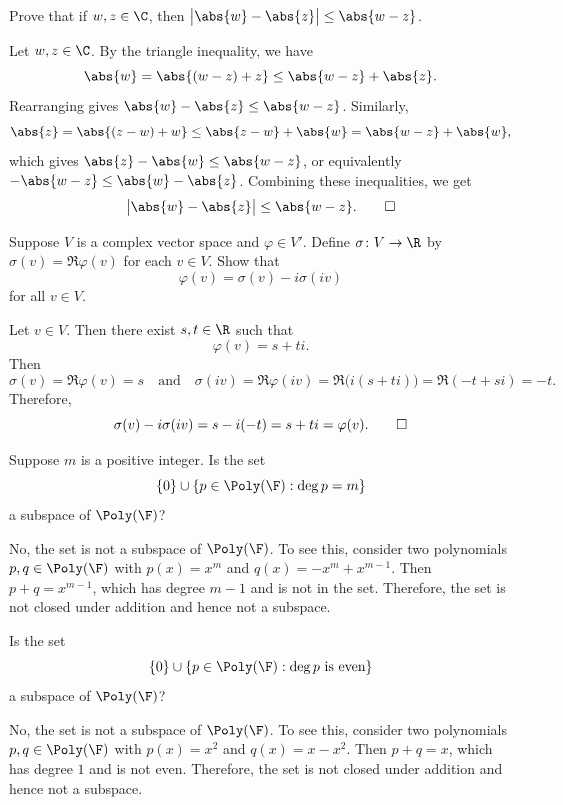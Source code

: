 \begin{exc}
\begin{exercise}
Prove that if $w,z\in\C$, then $\bigl\lvert\abs{w}-\abs{z}\bigr\rvert
\le\abs{w-z}$.
\end{exercise}
\begin{solution}
Let $w,z\in\C$. By the triangle inequality, we have
\[ \abs{w}=\abs{(w-z)+z}\le\abs{w-z}+\abs{z}. \]
Rearranging gives $\abs{w}-\abs{z}\le\abs{w-z}$. Similarly,
\[ \abs{z}=\abs{(z-w)+w}\le\abs{z-w}+\abs{w}=\abs{w-z}+\abs{w}, \]
which gives $\abs{z}-\abs{w}\le\abs{w-z}$, or equivalently
$-\abs{w-z}\le\abs{w}-\abs{z}$. Combining these inequalities, we get
\[ \bigl\lvert\abs{w}-\abs{z}\bigr\rvert\le\abs{w-z}. \qedhere \]
\end{solution}

\begin{exercise}
Suppose $V$ is a complex vector space and $\varphi\in V'$. Define
$\sigma\colon V\to\R$ by $\sigma(v)=\Re\varphi(v)$ for each $v\in V$. Show that
\[ \varphi(v) = \sigma(v)-i\sigma(iv) \]
for all $v\in V$.
\end{exercise}
\begin{solution}
Let $v\in V$. Then there exist $s,t\in\R$ such that
\[ \varphi(v)=s+ti. \]
Then
\[ \sigma(v)=\mathfrak{R}\varphi(v)=s \quad\text{and}\quad
   \sigma(iv)=\mathfrak{R}\varphi(iv)=\mathfrak{R}\bigl(i(s+ti)\bigr)
   =\mathfrak{R}(-t+si)=-t. \]
Therefore,
\[ \sigma(v)-i\sigma(iv)=s-i(-t)=s+ti=\varphi(v). \qedhere \]
\end{solution}

\begin{exercise}
Suppose $m$ is a positive integer. Is the set
\[ \{0\}\cup\{p\in\Poly(\F) : \deg p=m\} \]
a subspace of $\Poly(\F)$?
\end{exercise}
\begin{solution}
No, the set is not a subspace of $\Poly(\F)$. To see this, consider two
polynomials $p,q\in\Poly(\F)$ with $p(x)=x^m$ and $q(x)=-x^m+x^{m-1}$. Then
$p+q=x^{m-1}$, which has degree $m-1$ and is not in the set. Therefore, the set
is not closed under addition and hence not a subspace.
\end{solution}

\begin{exercise}
Is the set
\[ \{0\}\cup\{p\in\Poly(\F) : \deg p \text{ is even}\} \]
a subspace of $\Poly(\F)$?
\end{exercise}
\begin{solution}
No, the set is not a subspace of $\Poly(\F)$. To see this, consider two
polynomials $p,q\in\Poly(\F)$ with $p(x)=x^2$ and $q(x)=x-x^2$. Then $p+q=x$,
which has degree $1$ and is not even. Therefore, the set is not closed under
addition and hence not a subspace.
\end{solution}


\end{exc}

